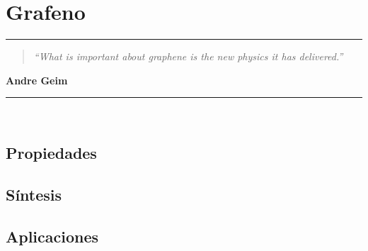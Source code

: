 \chapter{\label{cap:Grafeno}Grafeno}

\noindent
\rule{\linewidth}{1 pt}
\begin{flushright}
\begin{quotation}
\small{
\textit{``What is important about graphene is the new physics it has delivered.''}}
\end{quotation}
\bf{Andre Geim}
\end{flushright}
\noindent
\rule{\linewidth}{1 pt}\\
\vspace{1cm}

\section{\label{cap:Grafeno:sec:propiedades}Propiedades}

\section{\label{cap:Grafeno:sec:sintesis}Síntesis}

\section{\label{cap:Grapeno:sec:apliciones}Aplicaciones}